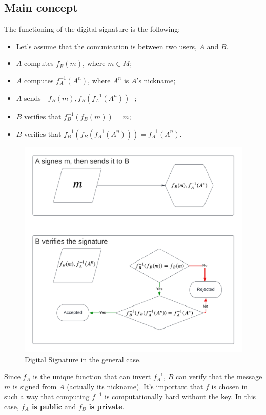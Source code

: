 \subsection{Main concept}
The functioning of the digital signature is the following:
\begin{itemize}
    \item Let's assume that the comunication is between two users, $A$ and $B$.
    \item $A$ computes $f_{B}(m)$, where $m \in M$;
    \item $A$ computes $f_{A}^{-1}(A^{n})$, where $A^{n}$ is $A$'s nickname;
    \item $A$ sends $[f_{B}(m), f_{B}(f_{A}^{-1}(A^{n}))]$;\label{dig_sign_sending}
    \item $B$ verifies that $f_{B}^{-1}(f_{B}(m)) = m$;
    \item $B$ verifies that $f_{B}^{-1}(f_{B}(f_{A}^{-1}(A^{n}))) = f_{A}^{-1}(A^{n})$.
\end{itemize}
\begin{figure}[h]
    \centering
    \includegraphics[width=1\textwidth]{img/DigSig.png}
    \caption{Digital Signature in the general case.}
\end{figure}
Since $f_{A}$ is the unique function that can invert $f_{A}^{-1}$, $B$ can verify that the message $m$ is signed from $A$ (actually its nickname). \newline
It's important that $f$ is chosen in such a way that computing $f^{-1}$ is computationally hard without the key. \newline
In this case, \textbf{$f_{A}$ is public} and \textbf{$f_{B}$ is private}.
